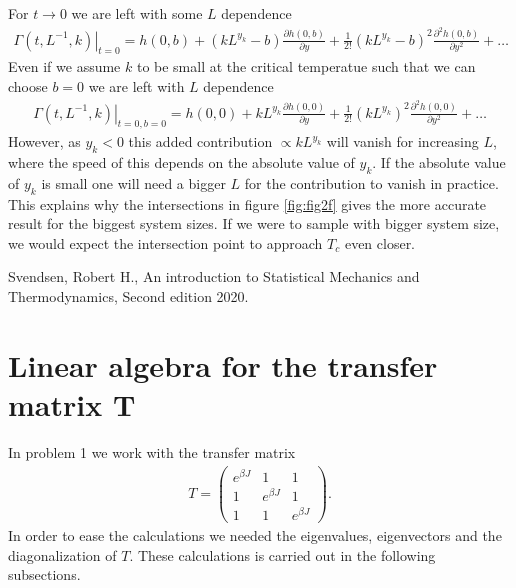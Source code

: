 \documentclass[reprint, amsmath, amssymb, aps, onecolumn]{revtex4-2}
\begin{document}
{{For $t\to 0$ we are left with some $L$ dependence
\begin{align*}
  \left. \Gamma(t, L^{-1},k) \right|_{t=0} = h(0,b) + (kL^{y_k}-b)\frac{\partial h(0,b)}{\partial y} + \frac{1}{2!}(kL^{y_k}-b)^2\frac{\partial ^2h(0,b)}{\partial y^2} + \hdots 
\end{align*}
Even if we assume $k$ to be small at the critical temperatue such that we can choose $b = 0$ we are left with $L$ dependence
\begin{align*}
  \left. \Gamma(t, L^{-1},k) \right|_{t=0, b = 0} = h(0,0) + kL^{y_k}\frac{\partial h(0,0)}{\partial y} + \frac{1}{2!}(kL^{y_k})^2\frac{\partial ^2h(0,0)}{\partial y^2} + \hdots
\end{align*}
However, as $y_k < 0$ this added contribution $\propto kL^{y_k}$ will vanish for increasing $L$, where the speed of this depends on the absolute value of $y_k$. If the absolute value of $y_k$ is small one will need a bigger $L$ for the contribution to vanish in practice. This explains why the intersections in figure \ref{fig:fig2f} gives the more accurate result for the biggest system sizes. If we were to sample with bigger system size, we would expect the intersection point to approach $T_c$ even closer.



\begin{thebibliography}{}
   Svendsen, Robert H., An introduction to Statistical Mechanics and Thermodynamics, Second edition 2020.
\end{thebibliography}
\clearpage

\appendix
\section{Linear algebra for the transfer matrix T}
\noindent In problem 1 we work with the transfer matrix
\begin{align*}
  T = \begin{pmatrix}
        e^{\beta J} & 1 & 1 \\
        1 & e^{\beta J} & 1 \\
        1 & 1 & e^{\beta J}
      \end{pmatrix}.
\end{align*}
In order to ease the calculations we needed the eigenvalues, eigenvectors and the diagonalization of $T$. These calculations is carried out in the following subsections.
%
%
}}
\end{document}
